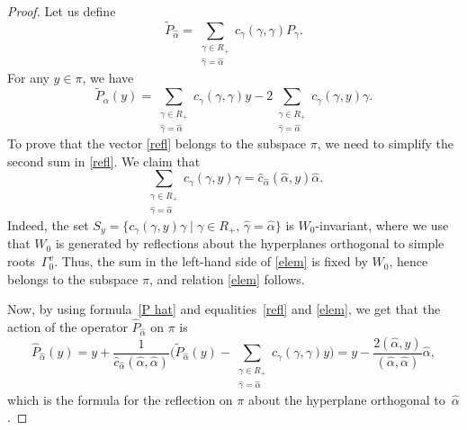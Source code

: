 \documentclass[12pt]{amsart}
\numberwithin{equation}{section}
\theoremstyle{definition}
\begin{document}
\begin{proof}
Let us define 
\begin{equation*}
    \widetilde{P}_{\widehat{\alpha}} = \sum_{\substack{ \gamma \in R_+ \\ \widehat{\gamma} = \widehat{\alpha}}} 
     c_{\gamma}(\gamma, \gamma) P_{\gamma}.
\end{equation*}
For any $y \in \pi$, we have
\begin{equation}
\label{refl}
    \widetilde{P}_{\widehat{\alpha}}(y) %
    = \sum\limits_{\substack{\gamma \in R_{+} \\ \widehat{\gamma} = \widehat{\alpha}}}c_{\gamma}(\gamma, \gamma) y - 2\sum\limits_{\substack{\gamma \in R_{+} \\\widehat{\gamma} = \widehat{\alpha}}} c_{\gamma} (\gamma,y) \gamma. 
\end{equation}
To prove that the vector \eqref{refl} belongs to the subspace $\pi$, we need to simplify the second sum in \eqref{refl}. We claim that 
\begin{equation}
\label{elem}
     \sum\limits_{\substack{\gamma \in R_{+} \\ \widehat{\gamma} = \widehat{\alpha}}} c_{\gamma} (\gamma,y) \gamma =  \widehat{c}_{\widehat{\alpha}} (\widehat{\alpha},y) \widehat{\alpha}.
\end{equation}
Indeed, 
the set $S_{y} = \{c_{\gamma} (\gamma,y)\gamma \mid \gamma \in R_+, \, \widehat{\gamma} = \widehat{\alpha}\}$  
is $W_0$-invariant, where we use that $W_0$ is generated by reflections about the hyperplanes orthogonal to simple roots~$\Gamma_0^v$. 
Thus, the sum in the left-hand side of \eqref{elem} is fixed by $W_0$, hence belongs to the subspace $\pi$, and relation \eqref{elem} follows.

Now,
by using formula~\eqref{P hat} and equalities~\eqref{refl} and \eqref{elem},
we get that the action of the operator $\widehat{P}_{\widehat{\alpha}}$ on $\pi$ is
\begin{equation*}
    \widehat{P}_{\widehat{\alpha}} (y) = y +
    \frac{1}{\widehat{c}_{\widehat{\alpha}} (\widehat{\alpha}, \widehat{\alpha})} \bigg(  \widetilde{P}_{\widehat{\alpha}}(y)-\sum_{\substack{ \gamma \in R_+ \\\widehat{\gamma} = \widehat{\alpha}}} 
    c_{\gamma}(\gamma, \gamma) y \bigg)
    = y - \frac{2 (\widehat{\alpha}, y)}{(\widehat{\alpha}, \widehat{\alpha})} \widehat{\alpha},
\end{equation*}
which is the formula for the reflection on $\pi$ about the hyperplane orthogonal to~$\widehat{\alpha}$.
\end{proof}
\end{document}
